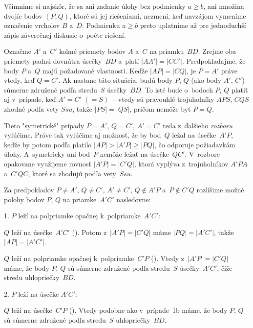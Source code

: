 {%
Všimnime si najskôr, že sa ani zadanie úlohy bez podmienky $a\ge b$,
ani množina dvojíc bodov $(P,Q)$, ktoré sú jej riešeniami,
nezmení, keď navzájom vymeníme označenie vrcholov $B$ a~$D$.
Podmienku $a\ge b$ preto uplatníme až pre jednoduchší zápis
záverečnej diskusie o~počte riešení.

Označme $A'$ a~$C'$ kolmé priemety bodov $A$ a~$C$
na priamku~$BD$. Zrejme oba priemety padnú dovnútra úsečky~$BD$
a~platí $|AA'| = |CC'|$.
Predpokladajme, že body $P$ a~$Q$ majú požadované vlastnosti.
Keďže $|AP| = |CQ|$, je
$P = A'$ práve vtedy, keď $Q = C'$.
Ak nastane táto situácia, budú body $P$, $Q$
(ako body $A'$, $C'$) súmerne združené
podľa stredu~$S$ úsečky~$BD$. To isté bude
o~bodoch $P$, $Q$ platiť aj v~prípade, keď $A'=C'$ $(=S)$~-- vtedy
sú pravouhlé trojuholníky $APS$, $CQS$
zhodné podľa vety $Ssu$, takže $|PS|=|QS|$, pričom nemôže byť $P=Q$.

Tieto "symetrické" prípady $P=A'$, $Q=C'$, $A'=C'$ teda
z~ďalšieho {\it rozboru\/} vylúčime.
Práve tak vylúčime aj možnosť, že by bod~$Q$ ležal na úsečke~$A'P$,
keďže by potom podľa \obr{} platilo $|AP|>|A'P|\ge|PQ|$, čo odporuje požiadavkám úlohy.
A~symetricky ani bod~$P$ nemôže ležať na úsečke~$QC'$.
V~rozbore opakovane využijeme rovnosť
$|A'P|=|C'Q|$, ktorá vyplýva z~trojuholníkov $A'PA$ a~$C'QC$, ktoré sa zhodujú
podľa vety~$Ssu$.%
\vadjust{\vskip-\baselineskip}
%

Za predpokladov $P\ne A'$, $Q\ne C'$, $A'\ne C'$, $Q\notin A'P$ a~$P\notin C'Q$
rozlíšime možné polohy bodov $P$, $Q$ na priamke~$A'C'$ nasledovne:

\item {1.} $P$ leží na polpriamke opačnej k~polpriamke~$A'C'$:


 $Q$ leží na úsečke~$A'C'$
(\obr). Potom z~$|A'P| = |C'Q|$ máme $|PQ| = |A'C'|$,
takže $|AP| = |A'C'|$.

 $Q$ leží na polpriamke opačnej k~polpriamke~$C'P$
(\obr). Vtedy z~$|A'P| = |C'Q|$ máme, že body $P$, $Q$ sú
súmerne združené podľa stredu~$S$ úsečky~$A'C'$, čiže stredu
uhlopriečky~$BD$.%
\vadjust{\vskip-\baselineskip}
%

\item {2.} $P$ leží na úsečke $A'C'$:

\nobreak

 $Q$ leží na úsečke~$C'P$
(\obr). Vtedy podobne ako v~prípade~1b máme, že body $P$, $Q$
sú súmerne združené podľa stredu~$S$ uhlopriečky~$BD$.

}
